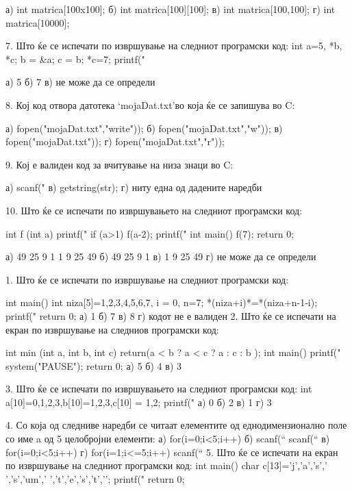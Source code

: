 {{{{{{{{а) int matrica[100x100];        б) int matrica[100][100];
в) int matrica[100,100];        г) int matrica[10000];

7. Што ќе се испечати по извршување на следниот програмски код:
    int a=5, *b, *c;
    b = &a; c = b; *c=7;
    printf("%

а) 5            б) 7            в) не може да се определи

8. Кој код отвора датотека ‘mojaDat.txt’во која ќе се запишува во C:

а) fopen("mojaDat.txt","write"));   б) fopen("mojaDat.txt","w"));
в) fopen("mojaDat.txt"));           г) fopen("mojaDat.txt","r"));

9. Кој е валиден код за вчитување на низа знаци во C:

а) scanf("%
в) getstring(str);      г) ниту една од дадените наредби

10. Што ќе се испечати по извршувањето на следниот програмски код:

int f (int a)
{   printf("%
    if (a>1) f(a-2);
    printf("%
}
int main()   {   f(7); return 0;  }

а) 49 25 9 1 1 9 25 49      б) 49 25 9 1
в) 1 9 25 49                г)  не може да се определи

1. Што ќе се испечати по извршување на следниот програмски код:

int main()
{   
    int niza[5]={1,2,3,4,5,6,7}, i = 0, n=7;
    *(niza+i)*=*(niza+n-1-i);
    printf("%
    return 0;
}
а) 1        б) 7        в) 8        г) кодот не е валиден
2. Што ќе се испечати на екран по извршување на следниов програмски код:

int min (int a, int b, int c)
{ return(a < b ? a < c ? a : c : b ); }
int main()
{    
    printf("%
    system("PAUSE");
    return 0;
}
а) 5                б) 4            в) 3

3. Што ќе се испечати по извршувањето на следниот програмски код:
int a[10]={0,1,2,3},b[10]={1,2,3},c[10] = {1,2};
printf("%
а) 0                    б) 2
в) 1                    г) 3

4. Со која од следниве наредби се читаат елементите од еднодимензионално поле со име a од 5 целобројни елементи:
а) for(i=0;i<5;i++)             б) scanf(“%
scanf(“%
в) for(i=0;i<5;i++)             г) for(i=1;i<=5;i++)    
    scanf(“%
5. Што ќе се испечати на екран по извршување на следниот програмски код:
        int main()
        {   char c[13]={'j','a','s',’ ’,’s’,’um’,’ ’,'t','e','s','t','\0'}; 
        printf("%
return 0;       }

}}}}}}}}
